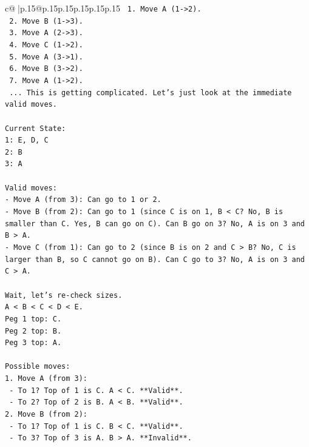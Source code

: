 \documentclass{article}
\begin{document}
{\begin{supertabular}{c@{$\;$}|p{.15\linewidth}@{}p{.15\linewidth}p{.15\linewidth}p{.15\linewidth}p{.15\linewidth}p{.15\linewidth}}
{{{\texttt{      1. Move A (1{-}>2).} \\
\texttt{      2. Move B (1{-}>3).} \\
\texttt{      3. Move A (2{-}>3).} \\
\texttt{      4. Move C (1{-}>2).} \\
\texttt{      5. Move A (3{-}>1).} \\
\texttt{      6. Move B (3{-}>2).} \\
\texttt{      7. Move A (1{-}>2).} \\
\texttt{      ... This is getting complicated. Let's just look at the immediate valid moves.} \\
\\ 
\texttt{Current State:} \\
\texttt{1: E, D, C} \\
\texttt{2: B} \\
\texttt{3: A} \\
\\ 
\texttt{Valid moves:} \\
\texttt{{-} Move A (from 3): Can go to 1 or 2.} \\
\texttt{{-} Move B (from 2): Can go to 1 (since C is on 1, B < C? No, B is smaller than C. Yes, B can go on C). Can B go on 3? No, A is on 3 and B > A.} \\
\texttt{{-} Move C (from 1): Can go to 2 (since B is on 2 and C > B? No, C is larger than B, so C cannot go on B). Can C go to 3? No, A is on 3 and C > A.} \\
\\ 
\texttt{Wait, let's re{-}check sizes.} \\
\texttt{A < B < C < D < E.} \\
\texttt{Peg 1 top: C.} \\
\texttt{Peg 2 top: B.} \\
\texttt{Peg 3 top: A.} \\
\\ 
\texttt{Possible moves:} \\
\texttt{1. Move A (from 3):} \\
\texttt{   {-} To 1? Top of 1 is C. A < C. **Valid**.} \\
\texttt{   {-} To 2? Top of 2 is B. A < B. **Valid**.} \\
\texttt{2. Move B (from 2):} \\
\texttt{   {-} To 1? Top of 1 is C. B < C. **Valid**.} \\
\texttt{   {-} To 3? Top of 3 is A. B > A. **Invalid**.} \\
}}}
\end{supertabular}}
\end{document}
